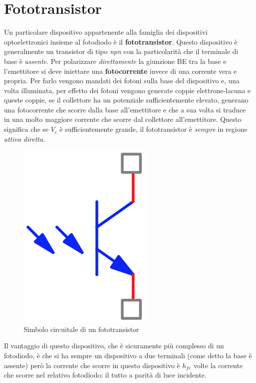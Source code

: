 \documentclass[12pt, a4paper]{report}
\begin{document}
\section{Fototransistor}
Un particolare dispositivo appartenente alla famiglia dei dispositivi optoelettronici insieme al fotodiodo è il \textbf{fototransistor}. Questo dispositivo è generalmente un transistor di tipo \textit{npn} con la particolarità che il terminale di base è \textit{assente}. Per polarizzare \textit{direttamente} la giunzione BE tra la base e l'emettitore si deve iniettare una \textbf{fotocorrente} invece di una corrente vera e propria. Per farlo vengono mandati dei fotoni sulla base del dispositivo e, una volta illuminata, per effetto dei fotoni vengono generate coppie elettrone-lacuna e queste coppie, se il collettore ha un potenziale sufficientemente elevato, generano una fotocorrente che scorre dalla base all'emettitore e che a sua volta si traduce in una molto maggiore corrente che scorre dal collettore all'emettitore. Questo significa che se $V_{c}$ è sufficientemente grande, il fototransistor è \textit{sempre} in regione \textit{attiva diretta}.
\begin{figure}[h]
    \centering
    \includegraphics[scale=0.5,angle=0]{phototransistor.png}
    \caption{Simbolo circuitale di un fototransistor}
\end{figure}

Il vantaggio di questo dispositivo, che è sicuramente più complesso di un fotodiodo, è che si ha sempre un dispositivo a due terminali (come detto la base è assente) però la corrente che scorre in questo dispositivo è $h_{fe}$ volte la corrente che scorre nel relativo fotodiodo; il tutto a parità di luce incidente.
\end{document}
